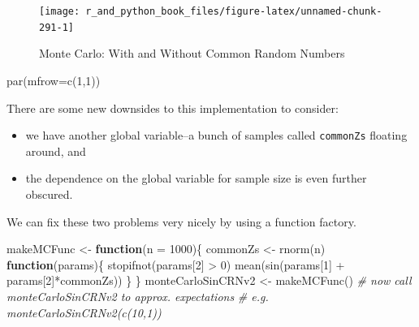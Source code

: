 \documentclass[
  12pt,
  krantz2]{krantz}
\makeatletter
\newenvironment{Shaded}{\begin{snugshade}}{\end{snugshade}}
\newcommand{\AttributeTok}[1]{\textcolor[rgb]{0.61,0.61,0.61}{#1}}
\newcommand{\CommentTok}[1]{\textcolor[rgb]{0.37,0.37,0.37}{\textit{#1}}}
\newcommand{\ControlFlowTok}[1]{\textcolor[rgb]{0.27,0.27,0.27}{\textbf{#1}}}
\newcommand{\DecValTok}[1]{\textcolor[rgb]{0.06,0.06,0.06}{#1}}
\newcommand{\FunctionTok}[1]{\textcolor[rgb]{0,0,0}{#1}}
\newcommand{\NormalTok}[1]{#1}
\newcommand{\OtherTok}[1]{\textcolor[rgb]{0.37,0.37,0.37}{#1}}
\newcommand{\SpecialCharTok}[1]{\textcolor[rgb]{0,0,0}{#1}}
\providecommand{\tightlist}{%
  \setlength{\itemsep}{0pt}\setlength{\parskip}{0pt}}
\newenvironment{kframe}{%
\medskip{}
\setlength{\fboxsep}{.8em}
 \def\at@end@of@kframe{}%
 \ifinner\ifhmode%
  \def\at@end@of@kframe{\end{minipage}}%
  \begin{minipage}{\columnwidth}%
 \fi\fi%
 \def\FrameCommand##1{\hskip\@totalleftmargin \hskip-\fboxsep
 \colorbox{shadecolor}{##1}\hskip-\fboxsep
     \hskip-\linewidth \hskip-\@totalleftmargin \hskip\columnwidth}%
 \MakeFramed {\advance\hsize-\width
   \@totalleftmargin\z@ \linewidth\hsize
   \@setminipage}}%
 {\par\unskip\endMakeFramed%
 \at@end@of@kframe}
\renewenvironment{Shaded}{\begin{kframe}}{\end{kframe}}
\makeatother
\begin{document}
\begin{figure}

{\centering \texttt{[image: r\_and\_python\_book\_files/figure-latex/unnamed-chunk-291-1]} 

}

\caption{Monte Carlo: With and Without Common Random Numbers}\label{fig:unnamed-chunk-291}
\end{figure}

\begin{Shaded}
\begin{Highlighting}[]
\FunctionTok{par}\NormalTok{(}\AttributeTok{mfrow=}\FunctionTok{c}\NormalTok{(}\DecValTok{1}\NormalTok{,}\DecValTok{1}\NormalTok{))}
\end{Highlighting}
\end{Shaded}

There are some new downsides to this implementation to consider:

\begin{itemize}
\tightlist
\item
  we have another global variable--a bunch of samples called \texttt{commonZs} floating around, and
\item
  the dependence on the global variable for sample size is even further obscured.
\end{itemize}

We can fix these two problems very nicely by using a function factory.

\begin{Shaded}
\begin{Highlighting}[]
\NormalTok{makeMCFunc }\OtherTok{\textless{}{-}} \ControlFlowTok{function}\NormalTok{(}\AttributeTok{n =} \DecValTok{1000}\NormalTok{)\{}
\NormalTok{  commonZs }\OtherTok{\textless{}{-}} \FunctionTok{rnorm}\NormalTok{(n)}
  \ControlFlowTok{function}\NormalTok{(params)\{}
    \FunctionTok{stopifnot}\NormalTok{(params[}\DecValTok{2}\NormalTok{] }\SpecialCharTok{\textgreater{}} \DecValTok{0}\NormalTok{) }
    \FunctionTok{mean}\NormalTok{(}\FunctionTok{sin}\NormalTok{(params[}\DecValTok{1}\NormalTok{] }\SpecialCharTok{+}\NormalTok{ params[}\DecValTok{2}\NormalTok{]}\SpecialCharTok{*}\NormalTok{commonZs))    }
\NormalTok{  \}  }
\NormalTok{\}}
\NormalTok{monteCarloSinCRNv2 }\OtherTok{\textless{}{-}} \FunctionTok{makeMCFunc}\NormalTok{()}
\CommentTok{\# now call monteCarloSinCRNv2 to approx. expectations}
\CommentTok{\# e.g. monteCarloSinCRNv2(c(10,1))}
\end{Highlighting}
\end{Shaded}
\end{document}
